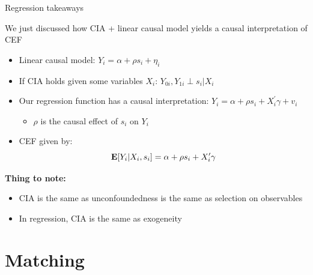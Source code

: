 \documentclass[compress, 8pt]{beamer}
\begin{document}
\begin{frame}{Regression takeaways}

We just discussed how CIA + linear causal model yields a causal interpretation of CEF
\begin{itemize}
    \item Linear causal model: $Y_i = \alpha + \rho s_i + \eta_i$
    \item If CIA holds given some variables $X_i$: $Y_{0i}, Y_{1i} \perp s_i \vert X_i$
    \item Our regression function has a causal interpretation: $Y_i = \alpha + \rho s_i + X_i^\prime \gamma + v_i$
    \begin{itemize}
        \item $\rho$ is the causal effect of $s_i$ on $Y_i$
    \end{itemize}
    \item CEF given by:
    \begin{equation*}
        \mathbf{E} [Y_i \vert X_i, s_i] = \alpha + \rho s_i + X_i^\prime \gamma
    \end{equation*}
\end{itemize}

\vspace{3ex}
\textbf{Thing to note:}
\begin{itemize}
    \item CIA is the same as unconfoundedness is the same as selection on observables
    \item In regression, CIA is the same as exogeneity
\end{itemize}

\end{frame}



\section[Matching]{Matching}
\miniframesoff
\begin{frame}
    \tableofcontents[currentsection]
\end{frame}
\miniframeson

\end{document}
